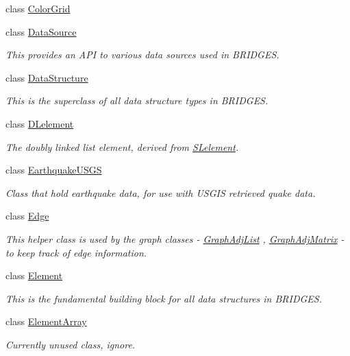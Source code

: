 \begin{DoxyCompactItemize}
class \hyperlink{classbridges_1_1_color_grid}{Color\+Grid}
\item 
class \hyperlink{classbridges_1_1_data_source}{Data\+Source}
\begin{DoxyCompactList}\small\item\em This provides an A\+P\+I to various data sources used in B\+R\+I\+D\+G\+E\+S. \end{DoxyCompactList}\item 
class \hyperlink{classbridges_1_1_data_structure}{Data\+Structure}
\begin{DoxyCompactList}\small\item\em This is the superclass of all data structure types in B\+R\+I\+D\+G\+E\+S. \end{DoxyCompactList}\item 
class \hyperlink{classbridges_1_1_d_lelement}{D\+Lelement}
\begin{DoxyCompactList}\small\item\em The doubly linked list element, derived from \hyperlink{classbridges_1_1_s_lelement}{S\+Lelement}. \end{DoxyCompactList}\item 
class \hyperlink{classbridges_1_1_earthquake_u_s_g_s}{Earthquake\+U\+S\+G\+S}
\begin{DoxyCompactList}\small\item\em Class that hold earthquake data, for use with U\+S\+G\+I\+S retrieved quake data. \end{DoxyCompactList}\item 
class \hyperlink{classbridges_1_1_edge}{Edge}
\begin{DoxyCompactList}\small\item\em This helper class is used by the graph classes -\/ \hyperlink{classbridges_1_1_graph_adj_list}{Graph\+Adj\+List} , \hyperlink{classbridges_1_1_graph_adj_matrix}{Graph\+Adj\+Matrix} -\/ to keep track of edge information. \end{DoxyCompactList}\item 
class \hyperlink{classbridges_1_1_element}{Element}
\begin{DoxyCompactList}\small\item\em This is the fundamental building block for all data structures in B\+R\+I\+D\+G\+E\+S. \end{DoxyCompactList}\item 
class \hyperlink{classbridges_1_1_element_array}{Element\+Array}
\begin{DoxyCompactList}\small\item\em Currently unused class, ignore. \end{DoxyCompactList}\item 

\end{DoxyCompactItemize}
